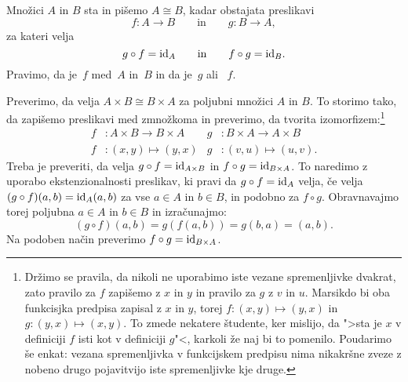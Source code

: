\begin{definicija}
  Množici $A$ in $B$ sta  in pišemo $A \cong B$, kadar obstajata preslikavi
  \begin{equation*}
    f : A \to B
    \qquad\text{in}\qquad
    g : B \to A,
  \end{equation*}
  za kateri velja
  \begin{equation*}
    g \circ f = \id[A]
    \qquad\text{in}\qquad
    f \circ g = \id[B].
  \end{equation*}
  Pravimo, da je~$f$  med~$A$ in~$B$ in da je~$g$  ali
  ~$f$.
\end{definicija}

Preverimo, da velja $A \times B \cong B \times A$ za poljubni množici $A$ in $B$. To
storimo tako, da zapišemo preslikavi med zmnožkoma in preverimo, da tvorita
izomorfizem:\footnote{Držimo se pravila, da nikoli ne uporabimo iste vezane spremenljivke
  dvakrat, zato pravilo za $f$ zapišemo z $x$ in $y$ in pravilo za $g$ z $v$ in $u$.
  Marsikdo bi oba funkcisjka predpisa zapisal z $x$ in $y$, torej
  $f : (x, y) \mapsto (y, x)$ in $g : (y, x) \mapsto (x, y)$. To zmede nekatere študente,
  ker mislijo, da ">sta je $x$ v definiciji $f$ isti kot v definiciji $g$"<, karkoli že
  naj bi to pomenilo. Poudarimo še enkat: vezana spremenljivka v funkcijskem predpisu nima
  nikakršne zveze z nobeno drugo pojavitvijo iste spremenljivke kje druge.}
%
\begin{align*}
  f &: A \times B \to B \times A &
  g &: B \times A \to A \times B \\
  f &: (x, y) \mapsto (y, x) &
  g &: (v, u) \mapsto (u, v).
\end{align*}
%
Treba je preveriti, da velja $g \circ f = \id[A \times B]$ in
$f \circ g = \id[B \times A]$. To naredimo z uporabo ekstenzionalnosti preslikav, ki pravi
da $g \circ f = \id[A]$ velja, če velja $(g \circ f)(a,b) = \id[A](a,b)$ za vse $a \in A$
in $b \in B$, in podobno za $f \circ g$. Obravnavajmo torej poljubna $a \in A$ in
$b \in B$ in izračunajmo:
%
\begin{equation*}
  (g \circ f)(a, b) =
  g (f (a, b)) = g (b, a) = (a, b).
\end{equation*}
%
Na podoben način preverimo $f \circ g = \id[B \times A]$.

